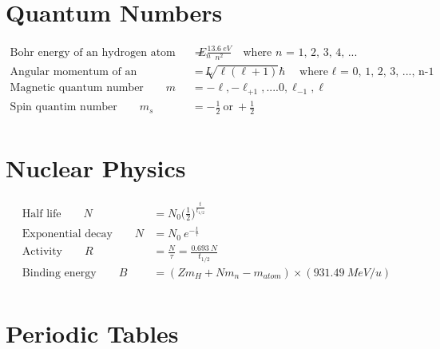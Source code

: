 \documentclass[]{article}
\begin{document}
\newpage


\section{Quantum Numbers}

\begin{align*}
	\text{Bohr energy of an hydrogen atom} \qquad E_n &= \frac{13.6 \ eV}{n^2} \quad \text{where $n$ = 1, 2, 3, 4, ...} \\
	\text{Angular momentum of an electron's orbit} \qquad L &= \sqrt{\ell(\ell+1)}\hbar \quad \text{where $\ell$ = 0, 1, 2, 3, ..., n-1} \\
	\text{Magnetic quantum number} \qquad m &= -\ell, -\ell_{+1}, ....0, \ell_{-1}, \ell \\
	\text{Spin quantim number} \qquad m_s &= -\frac{1}{2} \ \text{or} \  +\frac{1}{2} \\
\end{align*}


\newpage


\section{Nuclear Physics}

\begin{align*}
	\text{Half life} \qquad N &= N_0 {\Big( \frac{1}{2} \Big)}^{\frac{t}{t_{1/2}}} \\
	\text{Exponential decay} \qquad N &= N_0 \ e^{-\frac{t}{\tau}} \\
	\text{Activity} \qquad R &= \frac{N}{\tau} = \frac{0.693 \ N}{t_{1/2}} \\
	\text{Binding energy} \qquad B &= ( Z m_H + N m_n - m_{atom} ) \times (931.49 \ M eV/u) \\
\end{align*}

\newpage


\section{Periodic Tables}
\end{document}
